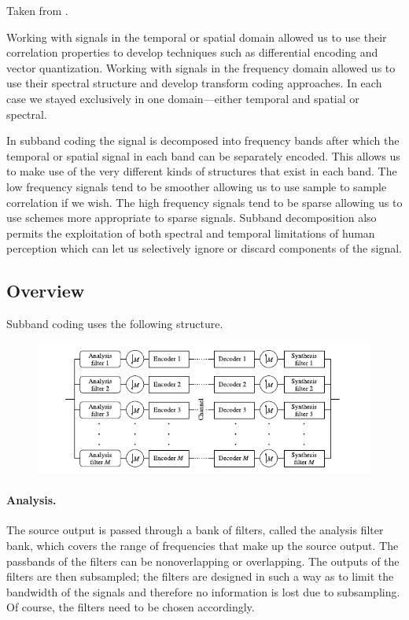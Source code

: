 
Taken from \cite{sayood2017introduction}.

Working with signals in the temporal or spatial domain allowed us to use their correlation properties to develop techniques such as differential encoding and vector quantization. Working with signals in the frequency domain allowed us to use their spectral structure and develop transform coding approaches. In each case we stayed exclusively in one domain—either temporal and spatial or spectral.


In subband coding the signal is decomposed into frequency bands after which the temporal or spatial signal in each band can be separately encoded. This allows us to make use of the very different kinds of structures that exist in each band. The low frequency signals tend to be smoother allowing us to use sample to sample correlation if we wish. The high frequency signals tend to be sparse allowing us to use schemes more appropriate to sparse signals. Subband decomposition also permits the exploitation of both spectral and temporal limitations of human perception which can let us selectively ignore or discard components of the signal.


\subsection{Overview}

Subband coding uses the following structure.


\begin{figure}[H]
    \centering
    \includegraphics[scale=0.7]{images/2021-11-09-subband_01.png}
\end{figure}


\paragraph{Analysis.} The source output is passed through a bank of filters, called the analysis filter bank, which covers the range of frequencies that make up the source output. The passbands of the filters can be nonoverlapping or overlapping. The outputs of the filters are then subsampled; the filters are designed in such a way as to limit the bandwidth of the signals and therefore no information is lost due to subsampling. Of course, the filters need to be chosen accordingly.



